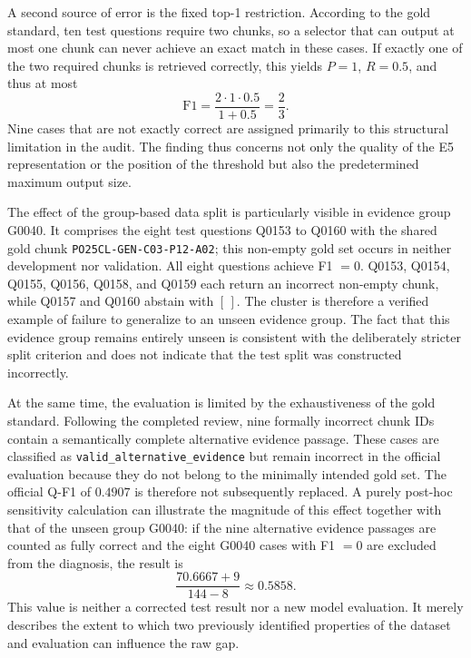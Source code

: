 \documentclass[11pt]{article}
\begin{document}
A second source of error is the fixed top-1 restriction. According to the gold standard, ten test questions require two chunks, so a selector that can output at most one chunk can never achieve an exact match in these cases. If exactly one of the two required chunks is retrieved correctly, this yields $P=1$, $R=0.5$, and thus at most
\begin{equation}
\mathrm{F1}=\frac{2\cdot1\cdot0.5}{1+0.5}=\frac{2}{3}.
\end{equation}
Nine cases that are not exactly correct are assigned primarily to this structural limitation in the audit. The finding thus concerns not only the quality of the E5 representation or the position of the threshold but also the predetermined maximum output size.

The effect of the group-based data split is particularly visible in evidence group G0040. It comprises the eight test questions Q0153 to Q0160 with the shared gold chunk \texttt{PO25CL-GEN-C03-P12-A02}; this non-empty gold set occurs in neither development nor validation. All eight questions achieve F1 $=0$. Q0153, Q0154, Q0155, Q0156, Q0158, and Q0159 each return an incorrect non-empty chunk, while Q0157 and Q0160 abstain with $[\,]$. The cluster is therefore a verified example of failure to generalize to an unseen evidence group. The fact that this evidence group remains entirely unseen is consistent with the deliberately stricter split criterion and does not indicate that the test split was constructed incorrectly.

At the same time, the evaluation is limited by the exhaustiveness of the gold standard. Following the completed review, nine formally incorrect chunk IDs contain a semantically complete alternative evidence passage. These cases are classified as \texttt{valid\_alternative\_evidence} but remain incorrect in the official evaluation because they do not belong to the minimally intended gold set. The official Q-F1 of $0.4907$ is therefore not subsequently replaced. A purely post-hoc sensitivity calculation can illustrate the magnitude of this effect together with that of the unseen group G0040: if the nine alternative evidence passages are counted as fully correct and the eight G0040 cases with F1 $=0$ are excluded from the diagnosis, the result is
\begin{equation}
\frac{70.6667+9}{144-8}\approx0.5858.
\end{equation}
This value is neither a corrected test result nor a new model evaluation. It merely describes the extent to which two previously identified properties of the dataset and evaluation can influence the raw gap.
\end{document}
